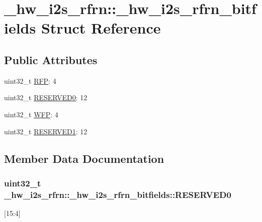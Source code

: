 \hypertarget{struct__hw__i2s__rfrn_1_1__hw__i2s__rfrn__bitfields}{}\section{\+\_\+hw\+\_\+i2s\+\_\+rfrn\+:\+:\+\_\+hw\+\_\+i2s\+\_\+rfrn\+\_\+bitfields Struct Reference}
\label{struct__hw__i2s__rfrn_1_1__hw__i2s__rfrn__bitfields}
\subsection*{Public Attributes}
\begin{DoxyCompactItemize}
\item 
uint32\+\_\+t \hyperlink{struct__hw__i2s__rfrn_1_1__hw__i2s__rfrn__bitfields_a0f11c23ffebb12ae3962ba83120206a0}{R\+FP}\+: 4
\item 
uint32\+\_\+t \hyperlink{struct__hw__i2s__rfrn_1_1__hw__i2s__rfrn__bitfields_a787b7bfe93a524c6ff8341e22ba0f04b}{R\+E\+S\+E\+R\+V\+E\+D0}\+: 12
\item 
uint32\+\_\+t \hyperlink{struct__hw__i2s__rfrn_1_1__hw__i2s__rfrn__bitfields_ae8d132c5f0b84a19c7671d55f603f067}{W\+FP}\+: 4
\item 
uint32\+\_\+t \hyperlink{struct__hw__i2s__rfrn_1_1__hw__i2s__rfrn__bitfields_a0d0d0510a667cd593b1b016fdf6ef214}{R\+E\+S\+E\+R\+V\+E\+D1}\+: 12
\end{DoxyCompactItemize}


\subsection{Member Data Documentation}
\subsubsection[{\texorpdfstring{R\+E\+S\+E\+R\+V\+E\+D0}{RESERVED0}}]{\setlength{\rightskip}{0pt plus 5cm}uint32\+\_\+t \+\_\+hw\+\_\+i2s\+\_\+rfrn\+::\+\_\+hw\+\_\+i2s\+\_\+rfrn\+\_\+bitfields\+::\+R\+E\+S\+E\+R\+V\+E\+D0}\hypertarget{struct__hw__i2s__rfrn_1_1__hw__i2s__rfrn__bitfields_a787b7bfe93a524c6ff8341e22ba0f04b}{}\label{struct__hw__i2s__rfrn_1_1__hw__i2s__rfrn__bitfields_a787b7bfe93a524c6ff8341e22ba0f04b}
\mbox{[}15\+:4\mbox{]} 
